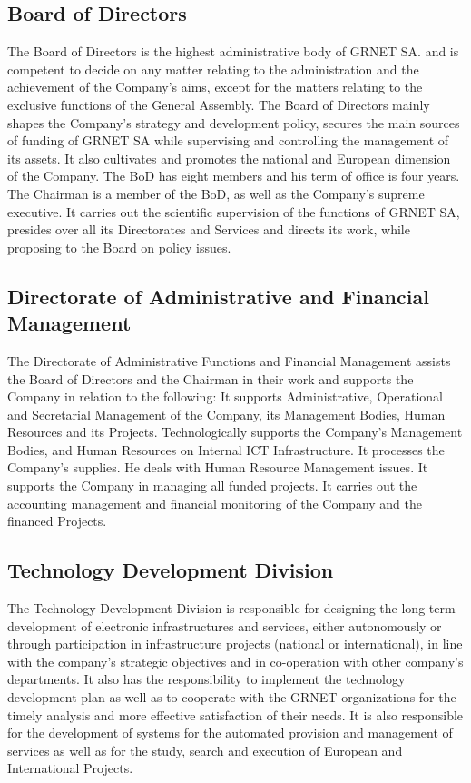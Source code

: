 \subsection{Board of Directors}
The Board of Directors is the highest administrative body of GRNET SA.
and is competent to decide on any matter relating to the administration and the achievement of the Company's aims,
except for the matters relating to the exclusive functions of the General Assembly.
The Board of Directors mainly shapes the Company's strategy and development policy,
secures the main sources of funding of GRNET SA while supervising and controlling the management of its assets.
It also cultivates and promotes the national and European dimension of the Company.
The BoD has eight members and his term of office is four years.
The Chairman is a member of the BoD, as well as the Company's supreme executive.
It carries out the scientific supervision of the functions of GRNET SA,
presides over all its Directorates and Services and directs its work, while proposing to the Board on policy issues.

\subsection{Directorate of Administrative and Financial Management}
The Directorate of Administrative Functions and Financial Management assists the Board of Directors and the Chairman
in their work and supports the Company in relation to the following:
It supports Administrative, Operational and Secretarial Management of the Company,
its Management Bodies, Human Resources and its Projects. Technologically supports the Company's Management Bodies,
and Human Resources on Internal ICT Infrastructure.
It processes the Company's supplies.
He deals with Human Resource Management issues.
It supports the Company in managing all funded projects.
It carries out the accounting management and financial monitoring of the Company and the financed Projects.

\subsection{Technology Development Division}
The Technology Development Division is responsible for designing the long-term development of electronic infrastructures and services,
either autonomously or through participation in infrastructure projects (national or international),
in line with the company's strategic objectives and in co-operation with other company's departments.
It also has the responsibility to implement the technology development plan
as well as to cooperate with the GRNET organizations for the timely analysis
and more effective satisfaction of their needs.
It is also responsible for the development of systems for the automated provision
and management of services as well as for the study, search and execution of European and International Projects.

